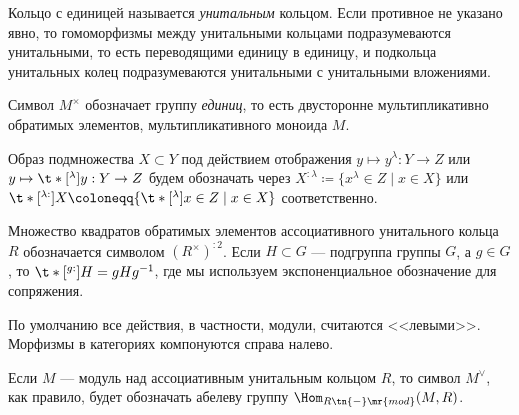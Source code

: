 \documentclass[
	extrafontsizes,
	11pt,
	hyphens,
]{memoir}
\begin{document}

\begin{convention}
Кольцо с единицей называется \emph{унитальным} кольцом.
\label{con:UnitalRing}
Если противное не указано явно, то гомоморфизмы между унитальными кольцами подразумеваются унитальными,
то есть переводящими единицу в единицу,
и подкольца унитальных колец подразумеваются унитальными с унитальными вложениями.
\end{convention}

\begin{notation}
Символ \(M^\times\) обозначает группу \emph{единиц}, то есть двусторонне мультипликативно обратимых элементов, мультипликативного моноида \(M\).
\end{notation}

\begin{notation}
\label{not:im_exp_not}
Образ подмножества \(X \subset Y\) под действием
отображения
\(y \mapsto y^\lambda : Y \to Z\)
или
\(y \mapsto \t*[^{\lambda}]{y}{} : Y \to Z\)
будем обозначать через
\(X^{:\lambda} \coloneqq \{x^\lambda \in Z \mid x \in X\}\)
или
\(\t*[^{\lambda:}]{X}{} \coloneqq \{\t*[^{\lambda}]{x}{} \in Z \mid x \in X\}\)
соответственно.
\end{notation}

\begin{example}
Множество квадратов обратимых элементов ассоциативного унитального кольца \(R\) обозначается символом \((R^\times)^{:2}\).
Если \(H \subset G\) --- подгруппа группы \(G\), а \(g \in G\), то \(\t*[^{g:}]{H}{} = gHg^{-1}\), где мы используем экспоненциальное обозначение для сопряжения.
\end{example}

\begin{convention}
По умолчанию все действия, в частности, модули, считаются <<левыми>>.
Морфизмы в категориях компонуются справа налево.
\end{convention}

\begin{notation}
Если \(M\) --- модуль над ассоциативным унитальным кольцом \(R\), то символ
\(M^\vee\),
как правило, будет обозначать абелеву группу
\(\Hom_{R\tn{-}\mr{mod}}(M,R)\).
\end{notation}
\end{document}
